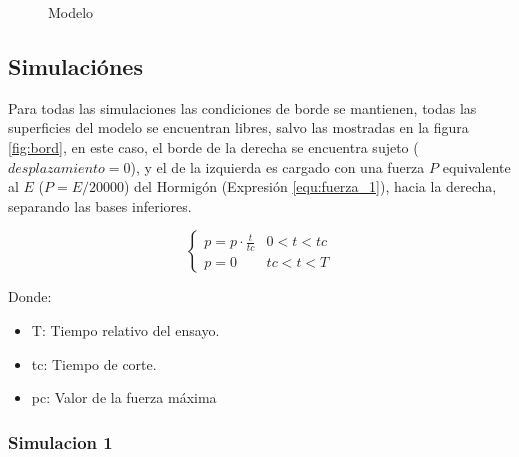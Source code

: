 \documentclass[12pt, a4paper]{article}
\begin{document}
\begin{figure}[h]
	\centering
	\caption{Modelo} \label{fig:modelo1}
\end{figure}


\subsection{Simulaciónes}

Para todas las simulaciones las condiciones de borde se mantienen, todas las superficies del modelo se encuentran libres, salvo las mostradas en la figura \ref{fig:bord}, en este caso, el borde de la derecha se encuentra sujeto ($desplazamiento=0$), y el de la izquierda es cargado con una fuerza $P$ equivalente al $E$ ($P=E/20000$) del Hormigón (Expresión \ref{equ:fuerza_1}), hacia la derecha, separando las bases inferiores.

\begin{equation}
	\left\{\begin{matrix}
		p=p \cdot \frac{t}{tc} & 0<t<tc \\ 
		p=0 & tc<t<T
		\end{matrix}
		\right.
	\label{equ:fuerza_1}
\end{equation}

Donde:
\begin{itemize}
	\item T: Tiempo relativo del ensayo.
	\item tc: Tiempo de corte.
	\item pc: Valor de la fuerza máxima
\end{itemize}


\subsubsection{Simulacion 1}
\end{document}
